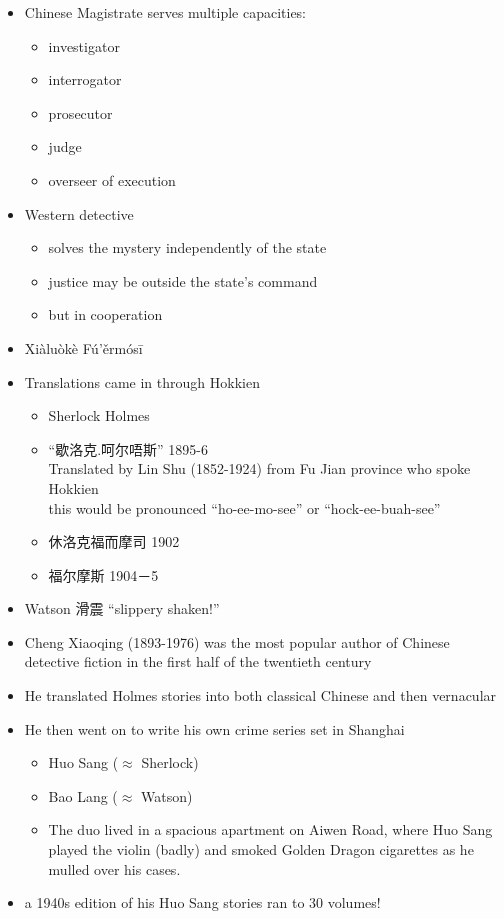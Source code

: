\documentclass[a4paper,landscape,headrule,footrule,xetex]{foils}
\begin{document}

\begin{itemize}
\item Chinese Magistrate serves multiple capacities:
  \begin{itemize}
  \item investigator
  \item interrogator 
  \item prosecutor 
  \item judge  
  \item overseer of execution
  \end{itemize}
\item Western detective
  \begin{itemize}
  \item solves the mystery independently of the state
  \item justice may be  outside the state's command
  \item but in cooperation
\end{itemize}
\end{itemize}

\begin{itemize}
\item Xiàluòkè Fú'ěrmósī
\item Translations came in through Hokkien
  \begin{itemize}
  \item Sherlock Holmes 
  \item “歇洛克.呵尔唔斯” 1895-6
\\ Translated by Lin Shu (1852-1924) from Fu Jian province who spoke
Hokkien
\\ this would be pronounced  “ho-ee-mo-see” or “hock-ee-buah-see”
  \item  休洛克福而摩司 1902
  \item  福尔摩斯 1904－5
  \end{itemize}
\item Watson 滑震 ``slippery shaken!''
\end{itemize}

\begin{itemize}
\item Cheng Xiaoqing (1893-1976) was the most popular author of
  Chinese detective fiction in the first half of the twentieth century
\item He translated Holmes stories into both classical Chinese and then
  vernacular
\item  He then went on to write his own crime series set in Shanghai
  \begin{itemize}
  \item Huo Sang ($\approx$ Sherlock)
  \item Bao Lang ($\approx$ Watson)
  \item The duo lived in a spacious apartment on Aiwen Road, where Huo
    Sang played the violin (badly) and smoked Golden Dragon cigarettes
    as he mulled over his cases.
  \end{itemize}
\item a 1940s edition of his Huo Sang stories ran to 30 volumes!
\end{itemize}
\end{document}
